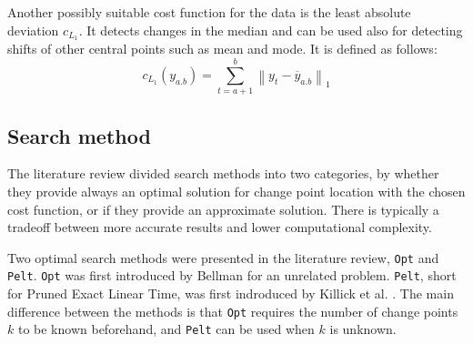 Another possibly suitable cost function for the data is the least absolute deviation $c_{L_1}$. It detects changes in the median and can be used also for detecting shifts of other central points such as mean and mode. It is defined as follows:
\begin{equation} %
  c_{L_1}(y_{a.b}) = \sum^b_{t=a+1} \left\lVert y_t-\overline{y}_{a.b} \right\rVert_1
  \label{eq:l1}
\end{equation}

\subsection{Search method} \label{subsec:searchmethod}

The literature review divided search methods into two categories, by whether they provide always an optimal solution for change point location with the chosen cost function, or if they provide an approximate solution. There is typically a tradeoff between more accurate results and lower computational complexity.

Two optimal search methods were presented in the literature review, \texttt{Opt} and \texttt{Pelt}. \texttt{Opt} was first introduced by Bellman \cite{bellmanRoutingProblem1958} for an unrelated problem. \texttt{Pelt}, short for Pruned Exact Linear Time, was first indroduced by Killick et al. \cite{killickOptimalDetectionChangepoints2012}. The main difference between the methods is that \texttt{Opt} requires the number of change points $k$ to be known beforehand, and \texttt{Pelt} can be used when $k$ is unknown. 

